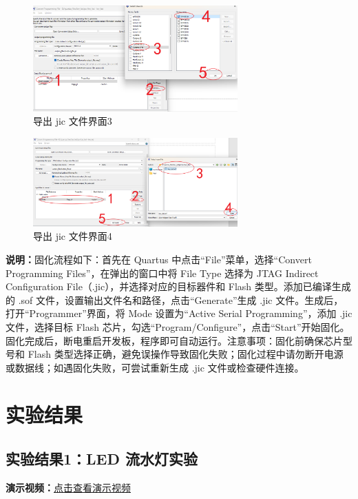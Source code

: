 \documentclass[UTF8]{article}
\theoremstyle{MyLineTheoremStyle} %
\theoremstyle{MyBlockTheoremStyle} %
\theoremstyle{MySubsubsectionStyle} %
\begin{document}
\begin{enumerate}
    \begin{figure}[H]
        \centering
        \includegraphics[width=0.7\textwidth]{step10_3.png}
        \caption{导出 jic 文件界面3}
        \label{fig:step10_3}
    \end{figure}

    \begin{figure}[H]
        \centering
        \includegraphics[width=0.7\textwidth]{step10_4.png}
        \caption{导出 jic 文件界面4}
        \label{fig:step10_4}
    \end{figure}

    \textbf{说明：}固化流程如下：首先在 Quartus 中点击“File”菜单，选择“Convert Programming Files”，在弹出的窗口中将 File Type 选择为 JTAG Indirect Configuration File（.jic），并选择对应的目标器件和 Flash 类型。添加已编译生成的 .sof 文件，设置输出文件名和路径，点击“Generate”生成 .jic 文件。生成后，打开“Programmer”界面，将 Mode 设置为“Active Serial Programming”，添加 .jic 文件，选择目标 Flash 芯片，勾选“Program/Configure”，点击“Start”开始固化。固化完成后，断电重启开发板，程序即可自动运行。注意事项：固化前确保芯片型号和 Flash 类型选择正确，避免误操作导致固化失败；固化过程中请勿断开电源或数据线；如遇固化失败，可尝试重新生成 .jic 文件或检查硬件连接。
\end{enumerate}




\cleardoublepage

\section{实验结果}

\subsection{实验结果1：LED 流水灯实验}
\noindent
\textbf{演示视频：}\href{https://www.bilibili.com/video/BV1H1VtzYEMq/?share_source=copy_web&vd_source=4fd6c4265e65c0785c912874692a3971}{点击查看演示视频}
\end{document}
